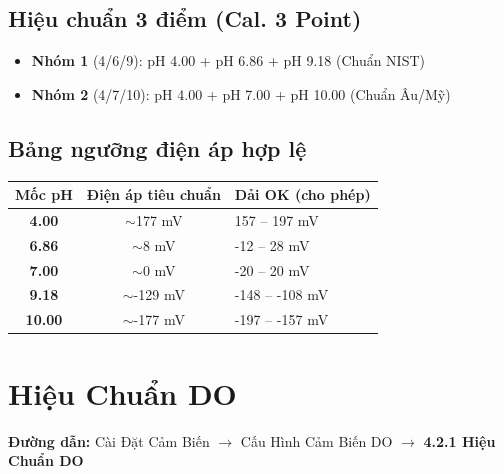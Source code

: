 \documentclass[12pt,a4paper]{article}
\begin{document}
\subsection{Hiệu chuẩn 3 điểm (Cal. 3 Point)}
\begin{itemize}[label={-}]
    \item \textbf{Nhóm 1} (4/6/9): pH 4.00 + pH 6.86 + pH 9.18 (Chuẩn NIST)
    \item \textbf{Nhóm 2} (4/7/10): pH 4.00 + pH 7.00 + pH 10.00 (Chuẩn Âu/Mỹ)
\end{itemize}

\subsection{Bảng ngưỡng điện áp hợp lệ}
\begin{table}[H]
\centering
\begin{tabularx}{0.8\textwidth}{|c|c|X|}
\hline
\textbf{Mốc pH} & \textbf{Điện áp tiêu chuẩn} & \textbf{Dải OK (cho phép)} \\ \hline
\textbf{4.00} & $\sim$177 mV & 157 -- 197 mV \\ \hline
\textbf{6.86} & $\sim$8 mV & -12 -- 28 mV \\ \hline
\textbf{7.00} & $\sim$0 mV & -20 -- 20 mV \\ \hline
\textbf{9.18} & $\sim$-129 mV & -148 -- -108 mV \\ \hline
\textbf{10.00} & $\sim$-177 mV & -197 -- -157 mV \\ \hline
\end{tabularx}
\end{table}


\section{Hiệu Chuẩn DO}
\label{sec:calib_do}

\textbf{Đường dẫn:} Cài Đặt Cảm Biến $\rightarrow$ Cấu Hình Cảm Biến DO $\rightarrow$ \textbf{4.2.1 Hiệu Chuẩn DO}
\end{document}
